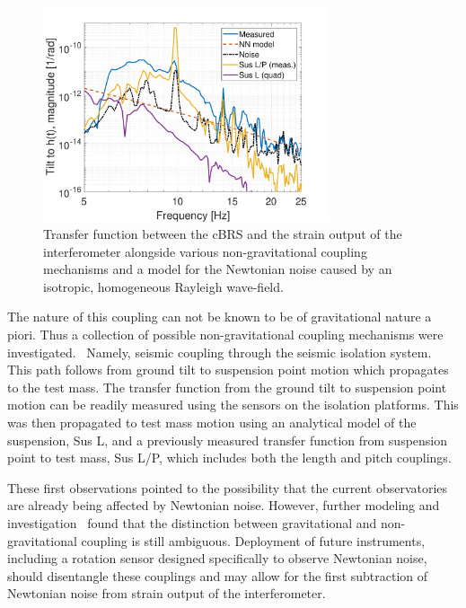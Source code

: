 \documentclass [12pt, proquest]{uwthesis}[2019]
\begin{document}
\begin{figure}[!h]
\begin{center}
\includegraphics[width=0.75\textwidth]{NNCoupling.pdf}
\end{center}
\caption[Transfer function between the cBRS and the strain output of the interferometer]{Transfer function between the cBRS and the strain output of the interferometer alongside various non-gravitational coupling mechanisms and a model for the Newtonian noise caused by an isotropic, homogeneous Rayleigh wave-field.}
\label{NNCoupling}
\end{figure}

The nature of this coupling can not be known to be of gravitational nature a piori. Thus a collection of possible non-gravitational coupling mechanisms were investigated.~\cite{NN} Namely, seismic coupling through the seismic isolation system. This path follows from ground tilt to suspension point motion which propagates to the test mass. The transfer function from the ground tilt to suspension point motion can be readily measured using the sensors on the isolation platforms. This was then propagated to test mass motion using an analytical model of the suspension, Sus L, and a previously measured transfer function from suspension point to test mass, Sus L/P, which includes both the length and pitch couplings.

These first observations pointed to the possibility that the current observatories are already being affected by Newtonian noise. However, further modeling and investigation~\cite{NN2} found that the distinction between gravitational and non-gravitational coupling is still ambiguous. Deployment of future instruments, including a rotation sensor designed specifically to observe Newtonian noise, should disentangle these couplings and may allow for the first subtraction of Newtonian noise from strain output of the interferometer.

\printendnotes
\nocite{*}   


\end{document}
